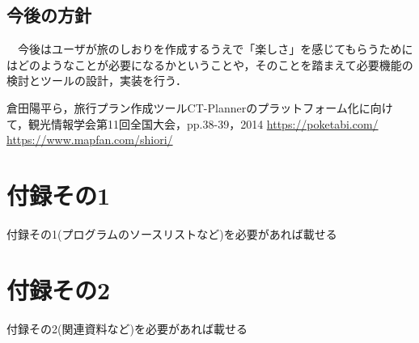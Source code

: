 \documentclass{funthesis}
\begin{document}
\section{今後の方針}
　今後はユーザが旅のしおりを作成するうえで「楽しさ」を感じてもらうためにはどのようなことが必要になるかということや，そのことを踏まえて必要機能の検討とツールの設計，実装を行う．






\begin{thebibliography}{9}
  倉田陽平ら，旅行プラン作成ツールCT-Plannerのプラットフォーム化に向けて，観光情報学会第11回全国大会，pp.38-39，2014
  {\url{https://poketabi.com/}}
  {\url{https://www.mapfan.com/shiori/}}
\end{thebibliography}


\appendix

\chapter*{付録その1} %

付録その1(プログラムのソースリストなど)を必要があれば載せる

\chapter*{付録その2}

付録その2(関連資料など)を必要があれば載せる

\listoffigures

\listoftables
\end{document}
